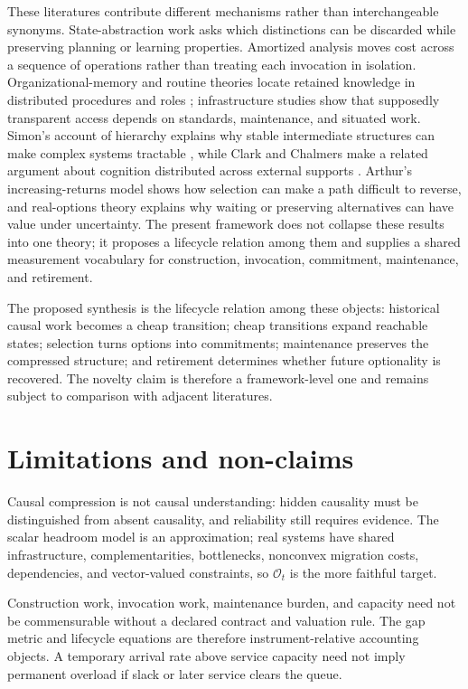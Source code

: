 \documentclass[11pt]{article}
\newcommand{\Oset}{\mathcal{O}}
\begin{document}
These literatures contribute different mechanisms rather than interchangeable synonyms. State-abstraction work asks which distinctions can be discarded while preserving planning or learning properties. Amortized analysis moves cost across a sequence of operations rather than treating each invocation in isolation. Organizational-memory and routine theories locate retained knowledge in distributed procedures and roles \citep{walshungson1991,nelsonwinter1982}; infrastructure studies show that supposedly transparent access depends on standards, maintenance, and situated work. Simon's account of hierarchy explains why stable intermediate structures can make complex systems tractable \citep{simon1962}, while Clark and Chalmers make a related argument about cognition distributed across external supports \citep{clarkchalmers1998}. Arthur's increasing-returns model shows how selection can make a path difficult to reverse, and real-options theory explains why waiting or preserving alternatives can have value under uncertainty. The present framework does not collapse these results into one theory; it proposes a lifecycle relation among them and supplies a shared measurement vocabulary for construction, invocation, commitment, maintenance, and retirement.

The proposed synthesis is the lifecycle relation among these objects: historical causal work becomes a cheap transition; cheap transitions expand reachable states; selection turns options into commitments; maintenance preserves the compressed structure; and retirement determines whether future optionality is recovered. The novelty claim is therefore a framework-level one and remains subject to comparison with adjacent literatures.

\section{Limitations and non-claims}

Causal compression is not causal understanding: hidden causality must be distinguished from absent causality, and reliability still requires evidence. The scalar headroom model is an approximation; real systems have shared infrastructure, complementarities, bottlenecks, nonconvex migration costs, dependencies, and vector-valued constraints, so \(\Oset_t\) is the more faithful target.

Construction work, invocation work, maintenance burden, and capacity need not be commensurable without a declared contract and valuation rule. The gap metric and lifecycle equations are therefore instrument-relative accounting objects. A temporary arrival rate above service capacity need not imply permanent overload if slack or later service clears the queue.
\end{document}
